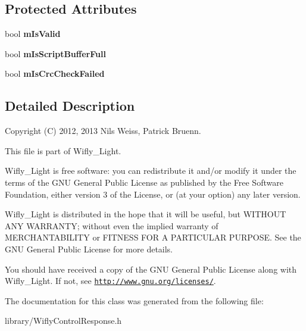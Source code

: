 \subsection*{Protected Attributes}
\begin{DoxyCompactItemize}
\item 
\hypertarget{class_wifly_response_a623b14a001d67b20f8b68d4678f980da}{bool {\bfseries m\-Is\-Valid}}\label{class_wifly_response_a623b14a001d67b20f8b68d4678f980da}

\item 
\hypertarget{class_wifly_response_a96140d95b1d54221bf6e81cf723f1192}{bool {\bfseries m\-Is\-Script\-Buffer\-Full}}\label{class_wifly_response_a96140d95b1d54221bf6e81cf723f1192}

\item 
\hypertarget{class_wifly_response_a5e3b9bdb3dea4b9cad2956126b3b18bb}{bool {\bfseries m\-Is\-Crc\-Check\-Failed}}\label{class_wifly_response_a5e3b9bdb3dea4b9cad2956126b3b18bb}

\end{DoxyCompactItemize}


\subsection{Detailed Description}
Copyright (C) 2012, 2013 Nils Weiss, Patrick Bruenn.

This file is part of Wifly\-\_\-\-Light.

Wifly\-\_\-\-Light is free software\-: you can redistribute it and/or modify it under the terms of the G\-N\-U General Public License as published by the Free Software Foundation, either version 3 of the License, or (at your option) any later version.

Wifly\-\_\-\-Light is distributed in the hope that it will be useful, but W\-I\-T\-H\-O\-U\-T A\-N\-Y W\-A\-R\-R\-A\-N\-T\-Y; without even the implied warranty of M\-E\-R\-C\-H\-A\-N\-T\-A\-B\-I\-L\-I\-T\-Y or F\-I\-T\-N\-E\-S\-S F\-O\-R A P\-A\-R\-T\-I\-C\-U\-L\-A\-R P\-U\-R\-P\-O\-S\-E. See the G\-N\-U General Public License for more details.

You should have received a copy of the G\-N\-U General Public License along with Wifly\-\_\-\-Light. If not, see \href{http://www.gnu.org/licenses/}{\tt http\-://www.\-gnu.\-org/licenses/}. 

The documentation for this class was generated from the following file\-:\begin{DoxyCompactItemize}
\item 
library/Wifly\-Control\-Response.\-h\end{DoxyCompactItemize}
